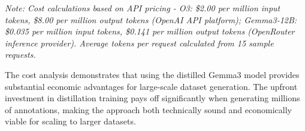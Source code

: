 \footnotesize
\textit{Note: Cost calculations based on API pricing - O3: \$2.00 per million input tokens, \$8.00 per million output tokens (OpenAI API platform); Gemma3-12B: \$0.035 per million input tokens, \$0.141 per million output tokens (OpenRouter inference provider). Average tokens per request calculated from 15 sample requests.}
\normalsize

The cost analysis demonstrates that using the distilled Gemma3 model provides substantial economic advantages for large-scale dataset generation. The upfront investment in distillation training pays off significantly when generating millions of annotations, making the approach both technically sound and economically viable for scaling to larger datasets.

\begin{figure*}[t]
\centering
\end{figure*}
